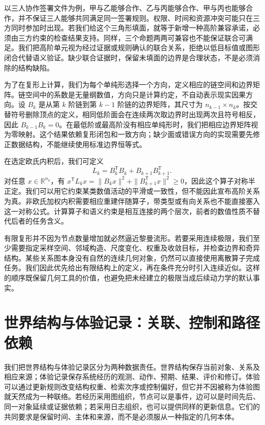 以三人协作签署文件为例，甲与乙能够合作、乙与丙能够合作、甲与丙也能够合作，并不保证三人能够共同满足同一签署规则。权限、时间和资源冲突可能只在三方同时参加时出现。若我们给这个三角形填面，就等于新增一种高阶兼容承诺，必须由三方约束的检查结果支持。同样，三个命题两两可兼容也不能保证联合可满足。我们把高阶单元视为经过证据或规则确认的联合关系，拒绝以低目标值或图形闭合代替语义验证。缺少联合证据时，保留未填面的边界是合理状态，不是必须消除的结构缺陷。

为了在复形上计算，我们为每个单纯形选择一个方向，定义相应的链空间和边界矩阵。链空间中的系数是无量纲数值，方向只是计算约定，不自动表示现实因果方向。设 $B_k$ 是从第 $k$ 阶链到第 $k-1$ 阶链的边界矩阵，其尺寸为 $n_{k-1}\times n_k$。按交替符号删除顶点的定义，相同低阶面会在连续两次取边界时出现两次且符号相反，因此 $B_{k-1}B_k=0$。在最低阶或最高阶没有相应单纯形时，我们把相应边界矩阵视为零映射。这个结果依赖复形闭包和一致方向；缺少面或错误方向的实现需要先修正数据结构，不能继续使用标准边界恒等式。

在选定欧氏内积后，我们可定义
\[
 L_k=B_k^{\mathsf T}B_k+B_{k+1}B_{k+1}^{\mathsf T}.
\]
对任意 $x\in\mathbb R^{n_k}$，有 $x^{\mathsf T}L_kx=\|B_kx\|^2+\|B_{k+1}^{\mathsf T}x\|^2\geq0$，因此这个算子对称半正定。我们可以用它约束某类数值活动的平滑或一致性，但不能因此宣布高阶关系为真。非欧氏加权内积需要相应重建伴随算子，带类型或有向关系也不能直接塞入这一对称公式。计算算子和语义约束是相互连接的两个层次，前者的数值性质不替代后者的任务含义。

有限复形并不因为节点数量增加就必然逼近黎曼流形。若要采用连续极限，我们至少需要指定采样空间、邻域构造、尺度变化、权重及收敛目标，并检查边界和奇异结构。某些关系图本身没有自然的连续几何对象，仍然可以直接使用离散算子完成任务。我们因此优先给出有限结构上的定义，再在条件充分时引入连续近似。这样的顺序既保留几何工具的价值，也避免把未经建立的极限当成后续动力学的默认事实。

\section{世界结构与体验记录：关联、控制和路径依赖}
\label{sec:section_8660}

我们把世界结构与体验记录区分为两种数据责任。世界结构保存当前对象、关系及相应来源；体验记录保存系统经历的观测、动作、预期、结果、评价和修订。体验可以通过更新规则改变结构权重、检索次序或控制偏好，但它并不因被称为体验图就天然成为一种联络。若经历采用图组织，节点可以是事件，边可以是时间先后、同一对象延续或证据依赖；若采用日志组织，也可以提供同样的更新信息。它们的共同要求是保留时间、主体和来源，而不是必须服从一种指定的几何本体。

